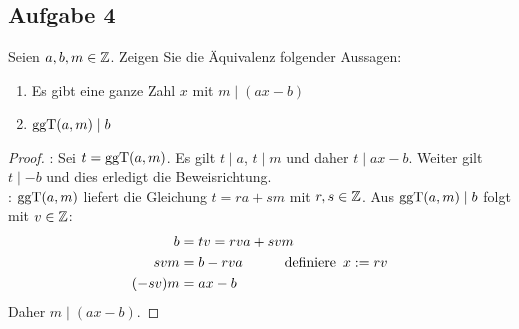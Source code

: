 \subsection{Aufgabe 4}
\label{70:4}
Seien $a,b,m \in \mathbb{Z}{}$. Zeigen Sie die Äquivalenz folgender Aussagen:
\begin{enumerate}[label=\roman*)]
  \item Es gibt eine ganze Zahl $x$ mit $m \mid (ax - b)$
  \item $\text{ggT}(a,m) \mid b$
\end{enumerate}
\begin{proof}
  : Sei $t = \text{ggT}(a,m)$. Es gilt $t \mid a$, $t \mid m$ und
  daher $t \mid ax - b$. Weiter gilt $t \mid -b$ und dies erledigt die Beweisrichtung.\\
  : $\text{ggT}(a,m)$ liefert die Gleichung $t = ra + sm$
  mit $r,s \in \mathbb{Z}{}$. Aus $\text{ggT}(a,m) \mid b$ folgt mit $v \in \mathbb{Z}{}$:
  \begin{equation*}
    \begin{aligned}
      b      & = tv = rva + svm                                              \\
      svm    & = b - rva \qquad\quad \text{definiere} \enspace x := rv \\
      (-sv)m & = ax - b
    \end{aligned}
  \end{equation*}
  Daher $m \mid (ax - b)$.
\end{proof}

